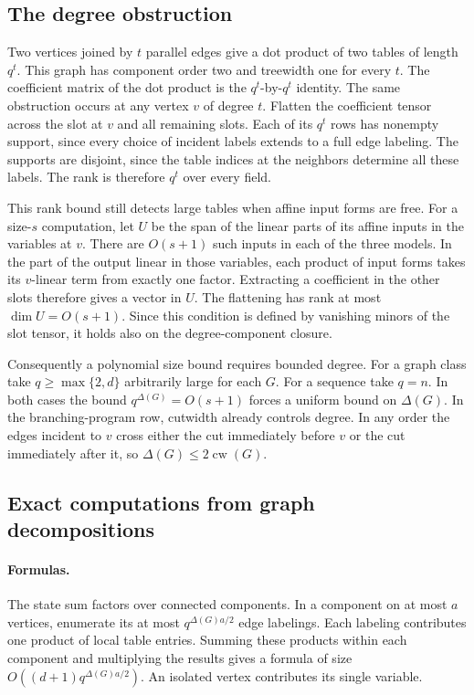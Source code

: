 \subsection{The degree obstruction}

Two vertices joined by \(t\) parallel edges give a dot product of two
tables of length \(q^t\). This graph has component order two and
treewidth one for every \(t\). The coefficient matrix of the dot
product is the \(q^t\)-by-\(q^t\) identity. The same obstruction occurs
at any vertex \(v\) of degree \(t\). Flatten the coefficient tensor
across the slot at \(v\) and all remaining slots. Each of its \(q^t\)
rows has nonempty support, since every choice of incident labels
extends to a full edge labeling. The supports are disjoint, since the
table indices at the neighbors determine all these labels. The rank is
therefore \(q^t\) over every field.

This rank bound still detects large tables when affine input forms
are free. For a size-\(s\) computation, let \(U\) be the span of the
linear parts of its affine inputs in the variables at \(v\). There are
\(O(s+1)\) such inputs in each of the three models. In the part of the
output linear in those variables, each product of input forms takes
its \(v\)-linear term from exactly one factor. Extracting a coefficient
in the other slots therefore gives a vector in \(U\). The flattening
has rank at most \(\dim U=O(s+1)\). Since this condition is defined
by vanishing minors of the slot tensor, it holds also on the
degree-component closure.

Consequently a polynomial size bound requires bounded degree. For a
graph class take \(q\ge\max\{2,d\}\) arbitrarily large for each \(G\).
For a sequence take \(q=n\). In both cases the bound
\(q^{\Delta(G)}=O(s+1)\) forces a uniform bound on \(\Delta(G)\).
In the branching-program row, cutwidth already controls degree. In
any order the edges incident to \(v\) cross either the cut immediately
before \(v\) or the cut immediately after it, so
\(\Delta(G)\le2\operatorname{cw}(G)\).

\subsection{Exact computations from graph decompositions}

\paragraph{Formulas.}
The state sum factors over connected components. In a component on
at most \(a\) vertices, enumerate its at most \(q^{\Delta(G)a/2}\)
edge labelings. Each labeling contributes one product of local table
entries. Summing these products within each component and multiplying
the results gives a formula of size \(O((d+1)q^{\Delta(G)a/2})\).
An isolated vertex contributes its single variable.

